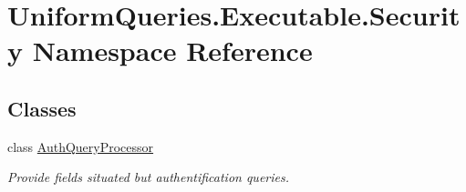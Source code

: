 \hypertarget{namespace_uniform_queries_1_1_executable_1_1_security}{}\section{Uniform\+Queries.\+Executable.\+Security Namespace Reference}
\label{namespace_uniform_queries_1_1_executable_1_1_security}
\subsection*{Classes}
\begin{DoxyCompactItemize}
\item 
class \mbox{\hyperlink{class_uniform_queries_1_1_executable_1_1_security_1_1_auth_query_processor}{Auth\+Query\+Processor}}
\begin{DoxyCompactList}\small\item\em Provide fields situated but authentification queries. \end{DoxyCompactList}\end{DoxyCompactItemize}
